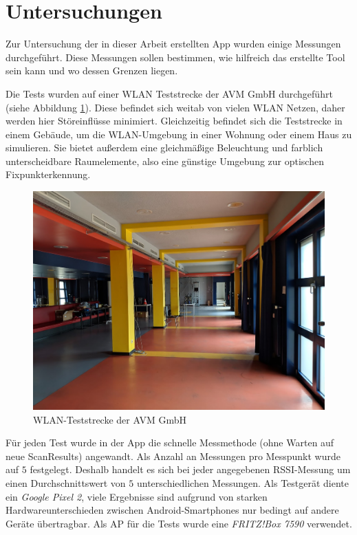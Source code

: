 \documentclass[10pt]{scrartcl}
\begin{document}
\newpage

\section{Untersuchungen}
Zur Untersuchung der in dieser Arbeit erstellten App wurden einige Messungen durchgeführt. Diese Messungen sollen bestimmen, wie hilfreich das erstellte Tool sein kann und wo dessen Grenzen liegen.

Die Tests wurden auf einer WLAN Teststrecke der AVM GmbH durchgeführt (siehe Abbildung \ref{img:wlan_loft}). Diese befindet sich weitab von vielen WLAN Netzen, daher werden hier Störeinflüsse minimiert. Gleichzeitig befindet sich die Teststrecke in einem Gebäude, um die WLAN-Umgebung in einer Wohnung oder einem Haus zu simulieren. Sie bietet außerdem eine gleichmäßige Beleuchtung und farblich unterscheidbare Raumelemente, also eine günstige Umgebung zur optischen Fixpunkterkennung.

\begin{figure}
\centering
\includegraphics[scale=0.25]{images/wlan_loft.jpg}
\caption{\label{img:wlan_loft}WLAN-Teststrecke der AVM GmbH}
\end{figure}

Für jeden Test wurde in der App die schnelle Messmethode (ohne Warten auf neue ScanResults) angewandt. Als Anzahl an Messungen pro Messpunkt wurde auf $5$ festgelegt. Deshalb handelt es sich bei jeder angegebenen RSSI-Messung um einen Durchschnittswert von $5$ unterschiedlichen Messungen. Als Testgerät diente ein \textit{Google Pixel 2}, viele Ergebnisse sind aufgrund von starken Hardwareunterschieden zwischen Android-Smartphones nur bedingt auf andere Geräte übertragbar. Als AP für die Tests wurde eine \textit{FRITZ!Box 7590} verwendet.
\end{document}
